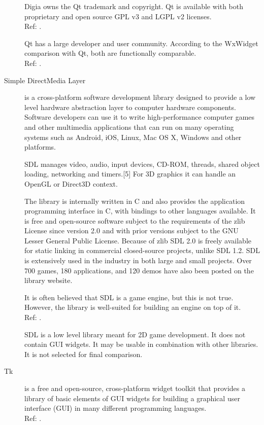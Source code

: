 \begin{description}
		Digia owns the Qt trademark and copyright. Qt is available with
		both proprietary and open source GPL v3 and LGPL v2 licenses.
		\hspace*{\fill}\\Ref: \cite{wiki:qt}.

		Qt has a large developer and user community. According
		to the WxWidget comparison with Qt, both are functionally comparable.
		\hspace*{\fill}\\Ref: \cite{wxwidget:comparison}.

    \item[Simple DirectMedia Layer] is a cross-platform software development
		library designed to provide a low level hardware abstraction
		layer to computer hardware components. Software developers
		can use it to write high-performance computer games and other
		multimedia applications that can run on many operating systems
		such as Android, iOS, Linux, Mac OS X, Windows and other platforms.

		SDL manages video, audio, input devices, CD-ROM, threads, shared
		object loading, networking and timers.[5] For 3D graphics it can
		handle an OpenGL or Direct3D context.

		The library is internally written in C and also provides the
		application programming interface in C, with bindings to other
		languages available. It is free and open-source software subject
		to the requirements of the zlib License since version 2.0 and with
		prior versions subject to the GNU Lesser General Public License.
		Because of zlib SDL 2.0 is freely available for static linking
		in commercial closed-source projects, unlike SDL 1.2. SDL is
		extensively used in the industry in both large and small projects.
		Over 700 games, 180 applications, and 120 demos have also been
		posted on the library website.

		It is often believed that SDL is a game engine, but this is not
		true. However, the library is well-suited for building an engine
		on top of it.
		\hspace*{\fill}\\Ref: \cite{wiki:sdl}.

		SDL is a low level library meant for 2D game development. It does not
		contain GUI widgets. It may be usable in combination with other
		libraries. It is not selected for final comparison.

	\item[Tk] is a free and open-source, cross-platform widget toolkit that
		provides a library of basic elements of GUI widgets for building a
		graphical user interface (GUI) in many different programming languages.
		\hspace*{\fill}\\Ref: \cite{wiki:tk}.


\end{description}
